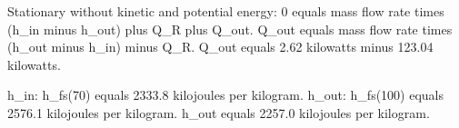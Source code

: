 Stationary without kinetic and potential energy:  
0 equals mass flow rate times (h_in minus h_out) plus Q_R plus Q_out.  
Q_out equals mass flow rate times (h_out minus h_in) minus Q_R.  
Q_out equals 2.62 kilowatts minus 123.04 kilowatts.  

h_in: h_fs(70) equals 2333.8 kilojoules per kilogram.  
h_out: h_fs(100) equals 2576.1 kilojoules per kilogram.  
h_out equals 2257.0 kilojoules per kilogram.